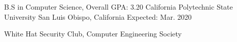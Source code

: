 


\begin{cventries}


\cventry
{B.S in Computer Science, Overall GPA: 3.20} %
{California Polytechnic State University} %
{San Luis Obispo, California} %
{Expected: Mar. 2020} %
{ %
\begin{cvitems}
\item {White Hat Security Club, Computer Engineering Society }
\end{cvitems}
}


\end{cventries}
